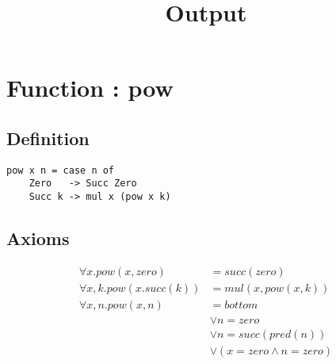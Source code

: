 \documentclass{article}
\begin{document}
\title{Output}

\maketitle

\section{Function : pow}

\subsection{Definition}

\begin{verbatim}
pow x n = case n of
    Zero   -> Succ Zero
    Succ k -> mul x (pow x k)
\end{verbatim}

\subsection{Axioms}

\begin{align*}
    \forall x . pow(x,zero) & = succ(zero) \\
    \forall x,k . pow(x.succ(k)) & = mul(x,pow(x,k)) \\
    \forall x,n . pow(x,n) & = bottom     \\
               & \vee n = zero \\
               & \vee n = succ(pred(n)) \\
               & \vee (x = zero \wedge n = zero) \\
\end{align*}
\end{document}

